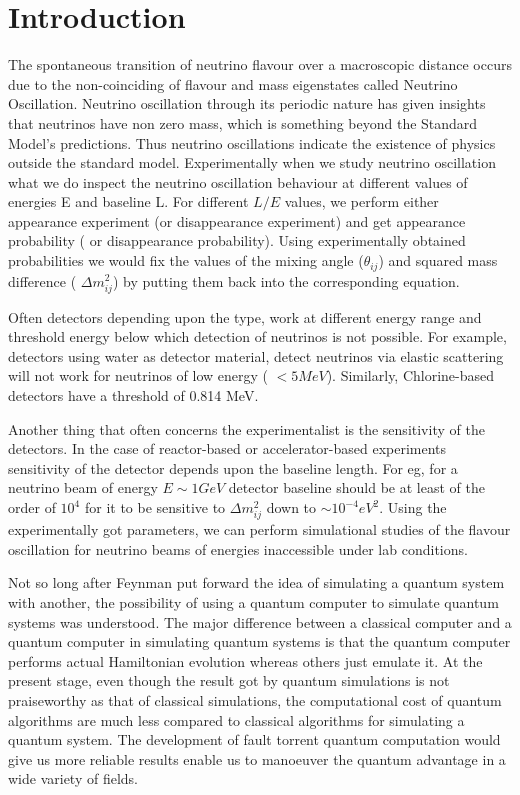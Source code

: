 \documentclass[12pt,a4paper]{report}
\begin{document}
\section{Introduction}
The spontaneous transition of neutrino flavour over a macroscopic distance occurs due to the non-coinciding of flavour and mass eigenstates called Neutrino Oscillation.  Neutrino oscillation through its periodic nature has given insights that neutrinos have non zero mass, which is something beyond the Standard Model’s predictions. Thus neutrino oscillations indicate the existence of physics outside the standard model. Experimentally when we study neutrino oscillation what we do inspect the neutrino oscillation behaviour at different values of energies E and baseline L. For different $L/E$ values, we perform either appearance experiment (or disappearance experiment) and get appearance probability ( or disappearance probability). Using experimentally obtained probabilities we would fix the values of the mixing angle ($\theta_{ij}$) and squared mass difference ( $\Delta m_{ij}^{2}$) by putting them back into the corresponding equation. \par
Often detectors depending upon the type, work at different energy range and threshold energy below which detection of neutrinos is not possible. For example, detectors using water as detector material, detect neutrinos via elastic scattering will not work for neutrinos of low energy ( $< 5 MeV$). Similarly, Chlorine-based detectors have a threshold of 0.814 MeV.\par
Another thing that often concerns the experimentalist is the sensitivity of the detectors. In the case of reactor-based or accelerator-based experiments sensitivity of the detector depends upon the baseline length. For eg, for a neutrino beam of energy $E \sim 1 GeV$ detector baseline should be at least of the order of $10^{4}$  for it to be sensitive to $\Delta m_{ij}^{2}$ down to $\sim 10^{-4} eV^{2}$. Using the experimentally got parameters, we can perform simulational studies of the flavour oscillation for neutrino beams of energies inaccessible under lab conditions.\par
Not so long after Feynman put forward the idea of simulating a quantum system with another, the possibility of using a quantum computer to simulate quantum systems was understood. The major difference between a classical computer and a quantum computer in simulating quantum systems is that the quantum computer performs actual Hamiltonian evolution whereas others just emulate it. At the present stage, even though the result got by quantum simulations is not praiseworthy as that of classical simulations, the computational cost of quantum algorithms are much less compared to classical algorithms for simulating a quantum system. The development of fault torrent quantum computation would give us more reliable results enable us to manoeuver the quantum advantage in a wide variety of fields.\par
\end{document}
